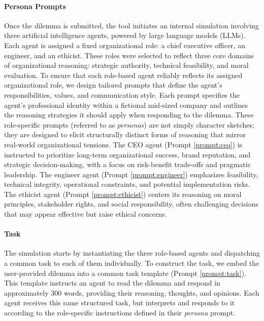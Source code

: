 \paragraph{Persona Prompts}{
  Once the dilemma is submitted, the tool initiates an internal simulation involving three artificial intelligence agents, powered by large language models (LLMs). Each agent is assigned a fixed organizational role: a chief executive officer, an engineer, and an ethicist. These roles were selected to reflect three core domains of organizational reasoning: strategic authority, technical feasibility, and moral evaluation.
  To ensure that each role-based agent reliably reflects its assigned organizational role, we design tailored prompts that define the agent's responsibilities, values, and communication style. Each prompt specifies the agent's professional identity within a fictional mid-sized company and outlines the reasoning strategies it should apply when responding to the dilemma.
  These role-specific prompts (referred to as \textit{personas}) are not simply character sketches; they are designed to elicit structurally distinct forms of reasoning that mirror real-world organizational tensions.
  The CEO agent (Prompt \ref{prompt:ceo}) is instructed to prioritize long-term organizational success, brand reputation, and strategic decision-making, with a focus on risk-benefit trade-offs and pragmatic leadership. The engineer agent (Prompt \ref{prompt:engineer}) emphasizes feasibility, technical integrity, operational constraints, and potential implementation risks. The ethicist agent (Prompt \ref{prompt:ethicist}) centers its reasoning on moral principles, stakeholder rights, and social responsibility, often challenging decisions that may appear effective but raise ethical concerns.
}

\paragraph{Task}{
  The simulation starts by instantiating the three role-based agents and dispatching a common task to each of them individually. To construct the task, we embed the user-provided dilemma into a common task template (Prompt \ref{prompt:task}). This template instructs an agent to read the dilemma and respond in approximately 300 words, providing their reasoning, thoughts, and opinions. Each agent receives this same structured task, but interprets and responds to it according to the role-specific instructions defined in their \textit{persona} prompt.
}

